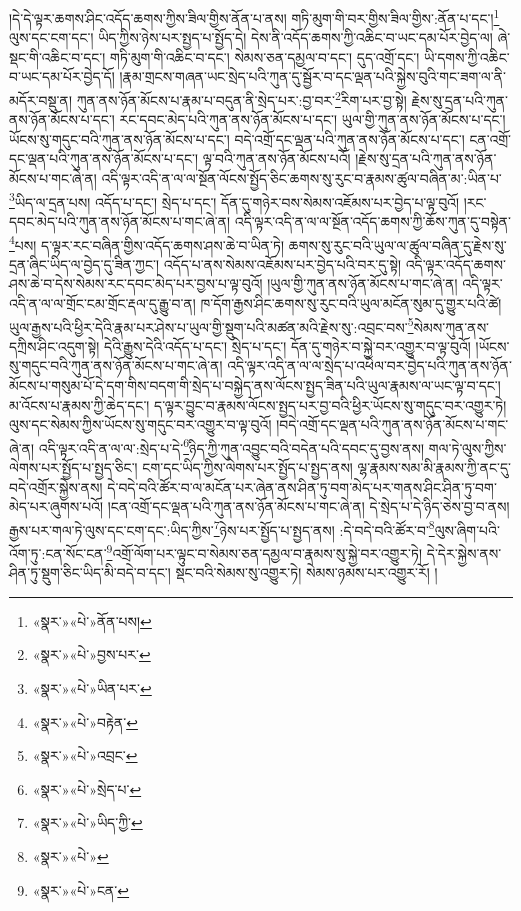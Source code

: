 །དེ་དེ་ལྟར་ཆགས་ཤིང་འདོད་ཆགས་ཀྱིས་ཟིལ་གྱིས་ནོན་པ་ནས། གཏི་མུག་གི་བར་གྱིས་ཟིལ་གྱིས་:ནོན་པ་དང་།\footnote{«སྣར་»«པེ་»ནོན་པས།} ལུས་དང་ངག་དང་། ཡིད་ཀྱིས་ཉེས་པར་སྤྱད་པ་སྤྱོད་དེ། དེས་ནི་འདོད་ཆགས་ཀྱི་འཆིང་བ་ཡང་དམ་པོར་བྱེད་ལ། ཞེ་སྡང་གི་འཆིང་བ་དང་། གཏི་མུག་གི་འཆིང་བ་དང་། སེམས་ཅན་དམྱལ་བ་དང་། དུད་འགྲོ་དང་། ཡི་དགས་ཀྱི་འཆིང་བ་ཡང་དམ་པོར་བྱེད་དོ། །རྣམ་གྲངས་གཞན་ཡང་སྲེད་པའི་ཀུན་དུ་སྦྱོར་བ་དང་ལྡན་པའི་སྐྱེས་བུའི་གང་ཟག་ལ་ནི་མདོར་བསྡུ་ན། ཀུན་ནས་ཉོན་མོངས་པ་རྣམ་པ་བདུན་ནི་སྲེད་པར་:བྱ་བར་\footnote{«སྣར་»«པེ་»བྱས་པར་}རིག་པར་བྱ་སྟེ། རྗེས་སུ་དྲན་པའི་ཀུན་ནས་ཉོན་མོངས་པ་དང་། རང་དབང་མེད་པའི་ཀུན་ནས་ཉོན་མོངས་པ་དང་། ཡུལ་གྱི་ཀུན་ནས་ཉོན་མོངས་པ་དང་། ཡོངས་སུ་གདུང་བའི་ཀུན་ནས་ཉོན་མོངས་པ་དང་། བདེ་འགྲོ་དང་ལྡན་པའི་ཀུན་ནས་ཉོན་མོངས་པ་དང་། ངན་འགྲོ་དང་ལྡན་པའི་ཀུན་ནས་ཉོན་མོངས་པ་དང་། ལྟ་བའི་ཀུན་ནས་ཉོན་མོངས་པའོ། །རྗེས་སུ་དྲན་པའི་ཀུན་ནས་ཉོན་མོངས་པ་གང་ཞེ་ན། འདི་ལྟར་འདི་ན་ལ་ལ་སྔོན་ལོངས་སྤྱོད་ཅིང་ཆགས་སུ་རུང་བ་རྣམས་ཚུལ་བཞིན་མ་:ཡིན་པ་\footnote{«སྣར་»«པེ་»ཡིན་པར་}ཡིད་ལ་དྲན་པས། འདོད་པ་དང་། སྲེད་པ་དང་། དོན་དུ་གཉེར་བས་སེམས་འཇོམས་པར་བྱེད་པ་ལྟ་བུའོ། །རང་དབང་མེད་པའི་ཀུན་ནས་ཉོན་མོངས་པ་གང་ཞེ་ན། འདི་ལྟར་འདི་ན་ལ་ལ་སྔོན་འདོད་ཆགས་ཀྱི་ཆོས་ཀུན་དུ་བསྟེན་\footnote{«སྣར་»«པེ་»བརྟེན་}པས། ད་ལྟར་རང་བཞིན་གྱིས་འདོད་ཆགས་ཤས་ཆེ་བ་ཡིན་ཏེ། ཆགས་སུ་རུང་བའི་ཡུལ་ལ་ཚུལ་བཞིན་དུ་རྗེས་སུ་དྲན་ཞིང་ཡིད་ལ་བྱེད་དུ་ཟིན་ཀྱང་། འདོད་པ་ནས་སེམས་འཇོམས་པར་བྱེད་པའི་བར་དུ་སྟེ། འདི་ལྟར་འདོད་ཆགས་ཤས་ཆེ་བ་དེས་སེམས་རང་དབང་མེད་པར་བྱས་པ་ལྟ་བུའོ། །ཡུལ་གྱི་ཀུན་ནས་ཉོན་མོངས་པ་གང་ཞེ་ན། འདི་ལྟར་འདི་ན་ལ་ལ་གྲོང་ངམ་གྲོང་རྡལ་དུ་རྒྱུ་བ་ན། ཁ་དོག་རྒྱས་ཤིང་ཆགས་སུ་རུང་བའི་ཡུལ་མངོན་སུམ་དུ་གྱུར་པའི་ཚེ། ཡུལ་རྒྱས་པའི་ཕྱིར་དེའི་རྣམ་པར་ཤེས་པ་ཡུལ་གྱི་སྡུག་པའི་མཚན་མའི་རྗེས་སུ་:འབྲང་བས་\footnote{«སྣར་»«པེ་»འབྲང་}སེམས་ཀུན་ནས་དཀྲིས་ཤིང་འདུག་སྟེ། དེའི་རྒྱུས་དེའི་འདོད་པ་དང་། སྲེད་པ་དང་། དོན་དུ་གཉེར་བ་སྐྱེ་བར་འགྱུར་བ་ལྟ་བུའོ། །ཡོངས་སུ་གདུང་བའི་ཀུན་ནས་ཉོན་མོངས་པ་གང་ཞེ་ན། འདི་ལྟར་འདི་ན་ལ་ལ་སྲེད་པ་འཕེལ་བར་བྱེད་པའི་ཀུན་ནས་ཉོན་མོངས་པ་གསུམ་པོ་དེ་དག་གིས་བདག་གི་སྲེད་པ་བསྐྱེད་ནས་ལོངས་སྤྱད་ཟིན་པའི་ཡུལ་རྣམས་ལ་ཡང་ལྟ་བ་དང་། མ་འོངས་པ་རྣམས་ཀྱི་ཆེད་དང་། ད་ལྟར་བྱུང་བ་རྣམས་ལོངས་སྤྱད་པར་བྱ་བའི་ཕྱིར་ཡོངས་སུ་གདུང་བར་འགྱུར་ཏེ། ལུས་དང་སེམས་ཀྱིས་ཡོངས་སུ་གདུང་བར་འགྱུར་བ་ལྟ་བུའོ། །བདེ་འགྲོ་དང་ལྡན་པའི་ཀུན་ནས་ཉོན་མོངས་པ་གང་ཞེ་ན། འདི་ལྟར་འདི་ན་ལ་ལ་:སྲེད་པ་དེ་\footnote{«སྣར་»«པེ་»སྲེད་པ་}ཉིད་ཀྱི་ཀུན་འབྱུང་བའི་བདེན་པའི་དབང་དུ་བྱས་ནས། གལ་ཏེ་ལུས་ཀྱིས་ལེགས་པར་སྤྱོད་པ་སྤྱད་ཅིང་། ངག་དང་ཡིད་ཀྱིས་ལེགས་པར་སྤྱོད་པ་སྤྱད་ནས། ལྷ་རྣམས་སམ་མི་རྣམས་ཀྱི་ནང་དུ་བདེ་འགྲོར་སྐྱེས་ནས། དེ་བདེ་བའི་ཚོར་བ་ལ་མངོན་པར་ཞེན་ནས་ཤིན་ཏུ་བག་མེད་པར་གནས་ཤིང་ཤིན་ཏུ་བག་མེད་པར་ཞུགས་པའོ། །ངན་འགྲོ་དང་ལྡན་པའི་ཀུན་ནས་ཉོན་མོངས་པ་གང་ཞེ་ན། དེ་སྲེད་པ་དེ་ཉིད་ཅེས་བྱ་བ་ནས། རྒྱས་པར་གལ་ཏེ་ལུས་དང་ངག་དང་:ཡིད་ཀྱིས་\footnote{«སྣར་»«པེ་»ཡིད་ཀྱི་}ཉེས་པར་སྤྱོད་པ་སྤྱད་ནས། :དེ་བདེ་བའི་ཚོར་བ་\footnote{«སྣར་»«པེ་»}ལུས་ཞིག་པའི་འོག་ཏུ་:ངན་སོང་ངན་\footnote{«སྣར་»«པེ་»ངན་}འགྲོ་ལོག་པར་ལྟུང་བ་སེམས་ཅན་དམྱལ་བ་རྣམས་སུ་སྐྱེ་བར་འགྱུར་ཏེ། དེ་དེར་སྐྱེས་ནས་ཤིན་ཏུ་སྡུག་ཅིང་ཡིད་མི་བདེ་བ་དང་། སྡང་བའི་སེམས་སུ་འགྱུར་ཏེ། སེམས་ཉམས་པར་འགྱུར་རོ། །
